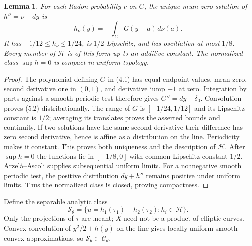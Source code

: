\documentclass[11pt]{article}
\newtheorem{lemma}[theorem]{Lemma}
\theoremstyle{definition}\newtheorem{definition}[theorem]{Definition}
\begin{document}
\begin{lemma}\label{circle}
For each Radon probability $\nu$ on $C$, the unique mean-zero solution
of $h''=\nu-dy$ is
\[
 h_\nu(y)=-\int_C G(y-a)\,d\nu(a).                       \tag{5.2}
\]
It has $-1/12\le h_\nu\le1/24$, is $1/2$-Lipschitz, and has
oscillation at most $1/8$. Every member of $\mathcal H$ is of this form
up to an additive constant. The normalized class $\sup h=0$ is compact
in uniform topology.
\end{lemma}
\begin{proof}
The polynomial defining $G$ in (4.1) has equal endpoint values, mean zero,
second derivative one in $(0,1)$, and derivative jump $-1$ at zero.
Integration by parts against a smooth periodic test therefore gives
$G''=dy-\delta_0$. Convolution proves (5.2) distributionally.
The range of $G$ is $[-1/24,1/12]$ and its Lipschitz constant is $1/2$;
averaging its translates proves the asserted bounds and continuity.
If two solutions have the same second derivative their difference has
zero second derivative, hence is affine as a distribution on the line.
Periodicity makes it constant. This proves both uniqueness and the
description of $\mathcal H$.
After $\sup h=0$ the functions lie in $[-1/8,0]$ with common Lipschitz
constant $1/2$. Arzel\`a--Ascoli supplies subsequential uniform limits.
For a nonnegative smooth periodic test, the positive distribution
$dy+h''$ remains positive under uniform limits. Thus the normalized
class is closed, proving compactness.
\end{proof}

Define the separable analytic class
\[
 \mathcal S_\theta=\{u=h_1(\tau_1)+h_2(\tau_2):h_i\in\mathcal H\}.
\]
Only the projections of $\tau$ are meant; $X$ need not be a product of
elliptic curves. Convex convolution of $y^2/2+h(y)$ on the line gives
locally uniform smooth convex approximations, so
$\mathcal S_\theta\subset\mathcal C_\theta$.
\end{document}
